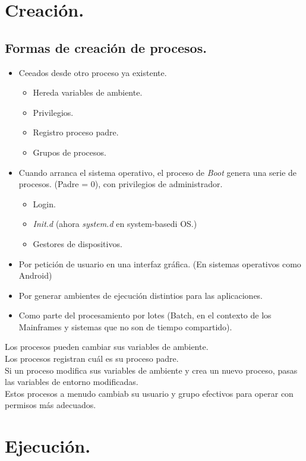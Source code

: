 \section{Creaci\'{o}n.}

\subsection{Formas de creaci\'{o}n de procesos.}
\begin{itemize}
	\item Ceeados desde otro proceso ya existente.
		\begin{itemize}
			\item Hereda variables de ambiente.
			\item Privilegios.
			\item Registro proceso padre.
			\item Grupos de procesos.
		\end{itemize}
	\item Cuando arranca el sistema operativo, el proceso de \textit{Boot} genera una serie de procesos. (Padre = 0), con privilegios de administrador.
		\begin{itemize}
			\item Login.
			\item \textit{Init.d} (ahora \textit{system.d} en system-basedi OS.)
			\item Gestores de dispositivos.
		\end{itemize}
	\item Por petici\'{o}n de usuario en una interfaz gr\'{a}fica. (En sistemas operativos como Android)
	\item Por generar ambientes de ejecuci\'{o}n distintios para las aplicaciones.
	\item Como parte del procesamiento por lotes (Batch, en el contexto de los Mainframes y sistemas que no son de tiempo compartido).
\end{itemize}
Los procesos pueden cambiar sus variables de ambiente.\\
Los procesos registran cu\'{a}l es su proceso padre.\\
Si un proceso modifica sus variables de ambiente y crea un nuevo proceso, pasas las variables de entorno modificadas.\\
Estos procesos a menudo cambiab su usuario y grupo efectivos para operar con permisos m\'{a}s adecuados.\\

\section{Ejecuci\'{o}n.}

